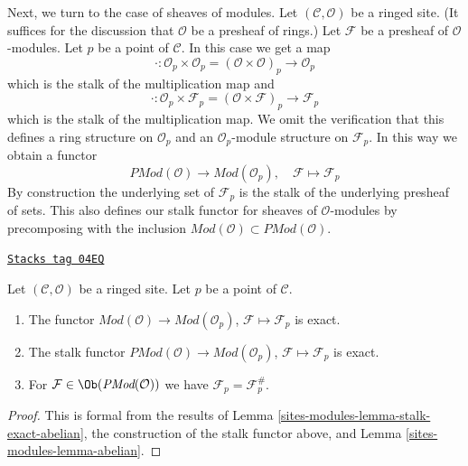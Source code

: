 Next, we turn to the case of sheaves of modules.
Let $(\mathcal{C}, \mathcal{O})$ be a ringed site.
(It suffices for the discussion that $\mathcal{O}$ be a presheaf
of rings.)
Let $\mathcal{F}$ be a presheaf of $\mathcal{O}$-modules.
Let $p$ be a point of $\mathcal{C}$. In this case we get a map
$$
\cdot :
\mathcal{O}_p \times \mathcal{O}_p
=
(\mathcal{O} \times \mathcal{O})_p
\longrightarrow
\mathcal{O}_p
$$
which is the stalk of the multiplication map and
$$
\cdot :
\mathcal{O}_p \times \mathcal{F}_p
=
(\mathcal{O} \times \mathcal{F})_p
\longrightarrow
\mathcal{F}_p
$$
which is the stalk of the multiplication map. We omit the verification
that this defines a ring structure on $\mathcal{O}_p$ and an
$\mathcal{O}_p$-module structure on $\mathcal{F}_p$.
In this way we obtain a functor
$$
\textit{PMod}(\mathcal{O}) \longrightarrow \textit{Mod}(\mathcal{O}_p), \quad
\mathcal{F} \longmapsto \mathcal{F}_p
$$
By construction the underlying set of $\mathcal{F}_p$ is the stalk of the
underlying presheaf of sets. This also defines our stalk functor for
sheaves of $\mathcal{O}$-modules by precomposing with the inclusion
$\textit{Mod}(\mathcal{O}) \subset \textit{PMod}(\mathcal{O})$.

\begin{lemma}
\label{sites-modules-lemma-stalk-exact-modules}
\href{https://stacks.math.columbia.edu/tag/04EQ}{\texttt{Stacks tag 04EQ}}

Let $(\mathcal{C}, \mathcal{O})$ be a ringed site.
Let $p$ be a point of $\mathcal{C}$.
\begin{enumerate}
\item The functor
$\textit{Mod}(\mathcal{O}) \to \textit{Mod}(\mathcal{O}_p)$,
$\mathcal{F} \mapsto \mathcal{F}_p$ is exact.
\item The stalk functor
$\textit{PMod}(\mathcal{O}) \to \textit{Mod}(\mathcal{O}_p)$,
$\mathcal{F} \mapsto \mathcal{F}_p$
is exact.
\item For $\mathcal{F} \in \Ob(\textit{PMod}(\mathcal{O}))$
we have $\mathcal{F}_p = \mathcal{F}^\#_p$.
\end{enumerate}
\end{lemma}

\begin{proof}
This is formal from the results of
Lemma \ref{sites-modules-lemma-stalk-exact-abelian},
the construction of the stalk functor above, and
Lemma \ref{sites-modules-lemma-abelian}.
\end{proof}


